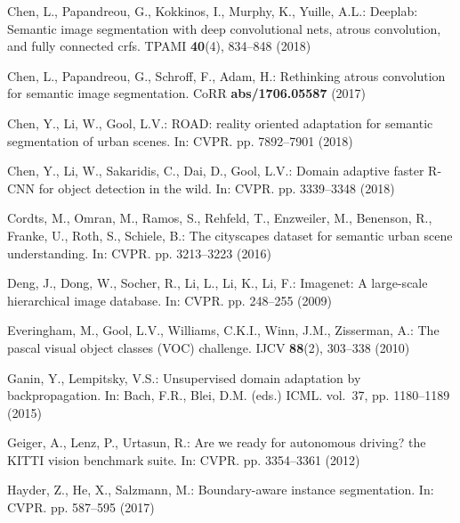 \documentclass[runningheads]{llncs}
\begin{document}
\begin{thebibliography}{10}
\providecommand{\url}[1]{\texttt{#1}}
\providecommand{\urlprefix}{URL }
\providecommand{\doi}[1]{https://doi.org/#1}

Chen, L., Papandreou, G., Kokkinos, I., Murphy, K., Yuille, A.L.: Deeplab:
  Semantic image segmentation with deep convolutional nets, atrous convolution,
  and fully connected crfs. TPAMI  \textbf{40}(4),  834--848 (2018)

Chen, L., Papandreou, G., Schroff, F., Adam, H.: Rethinking atrous convolution
  for semantic image segmentation. CoRR  \textbf{abs/1706.05587} (2017)

Chen, Y., Li, W., Gool, L.V.: {ROAD:} reality oriented adaptation for semantic
  segmentation of urban scenes. In: CVPR. pp. 7892--7901 (2018)

Chen, Y., Li, W., Sakaridis, C., Dai, D., Gool, L.V.: Domain adaptive faster
  {R-CNN} for object detection in the wild. In: CVPR. pp. 3339--3348 (2018)

Cordts, M., Omran, M., Ramos, S., Rehfeld, T., Enzweiler, M., Benenson, R.,
  Franke, U., Roth, S., Schiele, B.: The cityscapes dataset for semantic urban
  scene understanding. In: CVPR. pp. 3213--3223 (2016)

Deng, J., Dong, W., Socher, R., Li, L., Li, K., Li, F.: Imagenet: {A}
  large-scale hierarchical image database. In: CVPR. pp. 248--255 (2009)

Everingham, M., Gool, L.V., Williams, C.K.I., Winn, J.M., Zisserman, A.: The
  pascal visual object classes {(VOC)} challenge. IJCV  \textbf{88}(2),
  303--338 (2010)

Ganin, Y., Lempitsky, V.S.: Unsupervised domain adaptation by backpropagation.
  In: Bach, F.R., Blei, D.M. (eds.) ICML. vol.~37, pp. 1180--1189 (2015)

Geiger, A., Lenz, P., Urtasun, R.: Are we ready for autonomous driving? the
  {KITTI} vision benchmark suite. In: CVPR. pp. 3354--3361 (2012)

Hayder, Z., He, X., Salzmann, M.: Boundary-aware instance segmentation. In:
  CVPR. pp. 587--595 (2017)


\end{thebibliography}
\end{document}
